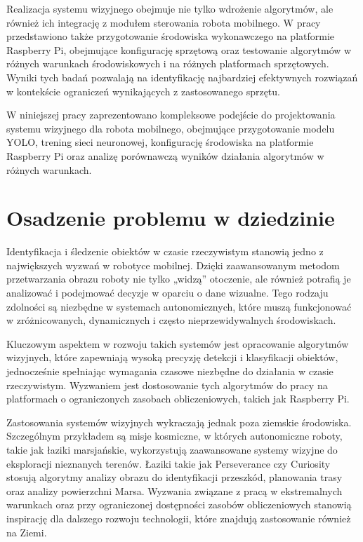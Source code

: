 \documentclass[a4paper,twoside,12pt]{book}
\begin{document}
Realizacja systemu wizyjnego obejmuje nie tylko wdrożenie algorytmów, ale również ich integrację z modułem sterowania robota mobilnego. W pracy przedstawiono także przygotowanie środowiska wykonawczego na platformie Raspberry Pi, obejmujące konfigurację sprzętową oraz testowanie algorytmów w różnych warunkach środowiskowych i na różnych platformach sprzętowych. Wyniki tych badań pozwalają na identyfikację najbardziej efektywnych rozwiązań w kontekście ograniczeń wynikających z zastosowanego sprzętu.

W niniejszej pracy zaprezentowano kompleksowe podejście do projektowania systemu wizyjnego dla robota mobilnego, obejmujące przygotowanie modelu YOLO, trening sieci neuronowej, konfigurację środowiska na platformie Raspberry Pi oraz analizę porównawczą wyników działania algorytmów w różnych warunkach.
\newpage
\section{Osadzenie problemu w dziedzinie}
Identyfikacja i śledzenie obiektów w czasie rzeczywistym stanowią jedno z największych wyzwań w robotyce mobilnej. Dzięki zaawansowanym metodom przetwarzania obrazu roboty nie tylko „widzą” otoczenie, ale również potrafią je analizować i podejmować decyzje w oparciu o dane wizualne. Tego rodzaju zdolności są niezbędne w systemach autonomicznych, które muszą funkcjonować w zróżnicowanych, dynamicznych i często nieprzewidywalnych środowiskach.

Kluczowym aspektem w rozwoju takich systemów jest opracowanie algorytmów wizyjnych, które zapewniają wysoką precyzję detekcji i klasyfikacji obiektów, jednocześnie spełniając wymagania czasowe niezbędne do działania w czasie rzeczywistym. Wyzwaniem jest dostosowanie tych algorytmów do pracy na platformach o ograniczonych zasobach obliczeniowych, takich jak Raspberry Pi.

Zastosowania systemów wizyjnych wykraczają jednak poza ziemskie środowiska. Szczególnym przykładem są misje kosmiczne, w których autonomiczne roboty, takie jak łaziki marsjańskie, wykorzystują zaawansowane systemy wizyjne do eksploracji nieznanych terenów. Łaziki takie jak Perseverance czy Curiosity stosują algorytmy analizy obrazu do identyfikacji przeszkód, planowania trasy oraz analizy powierzchni Marsa. Wyzwania związane z pracą w ekstremalnych warunkach oraz przy ograniczonej dostępności zasobów obliczeniowych stanowią inspirację dla dalszego rozwoju technologii, które znajdują zastosowanie również na Ziemi.
\end{document}
